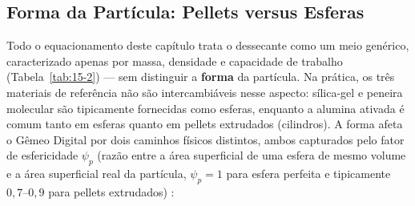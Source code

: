\documentclass[12pt,a4paper]{article}
\numberwithin{equation}{section}
\numberwithin{table}{section}
\numberwithin{figure}{section}
\begin{document}
		\subsection{\textbf{Forma da Partícula: Pellets versus Esferas}}
		Todo o equacionamento deste capítulo trata o dessecante como um meio genérico, caracterizado apenas por massa, densidade e capacidade de trabalho (Tabela~\ref{tab:15-2}) — sem distinguir a \textbf{forma} da partícula. Na prática, os três materiais de referência não são intercambiáveis nesse aspecto: sílica-gel e peneira molecular são tipicamente fornecidas como esferas, enquanto a alumina ativada é comum tanto em esferas quanto em pellets extrudados (cilindros). A forma afeta o Gêmeo Digital por dois caminhos físicos distintos, ambos capturados pelo fator de esfericidade $\psi_p$ (razão entre a área superficial de uma esfera de mesmo volume e a área superficial real da partícula, $\psi_p = 1$ para esfera perfeita e tipicamente $0{,}7$--$0{,}9$ para pellets extrudados) \cite{ergun}:
\end{document}
